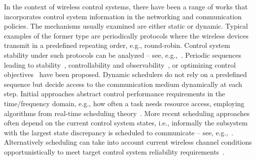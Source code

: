 In the context of wireless control systems, there have been a range of works that incorporates control system information in the networking and communication policies.
%
The mechanisms usually examined are either static or dynamic. Typical examples of the former type are periodically protocols where the wireless devices transmit in a predefined repeating order, e.g., round-robin. Control system stability under such protocols can be analyzed -- see, e.g.,~\cite{Hespanha_survey, Schenato_foundations, Donkers_switched, Branicky_stability}. Periodic sequences leading to stability~\cite{Hristu_shared_feedback}, controllability and observability~\cite{Hristu_communication_control}, or optimizing control objectives~\cite{LeNy_resource_LQR,Meier_measurement_control, Scheduling_control_combinatorics} have been proposed.
%
Dynamic schedulers do not rely on a predefined sequence but decide access to the communication medium dynamically at each step. %
Initial approaches abstract control performance requirements in the time/frequency domain, e.g., how often a task needs resource access, employing algorithms from real-time scheduling theory~\cite{Branicky_RM, Liu_Real_time_systems}. More recent scheduling approaches often depend on the current control system states, i.e., informally the subsystem with the largest state discrepancy is scheduled to communicate -- see, e.g.,~\cite{Donkers_switched,  Cervin_event_scheduling, mamduhi2014event,shi2011optimal,han2017optimal}.
%
Alternatively scheduling can take into account current wireless channel conditions opportunistically to meet target control system reliability requirements~\cite{GatsisEtal15}. 



